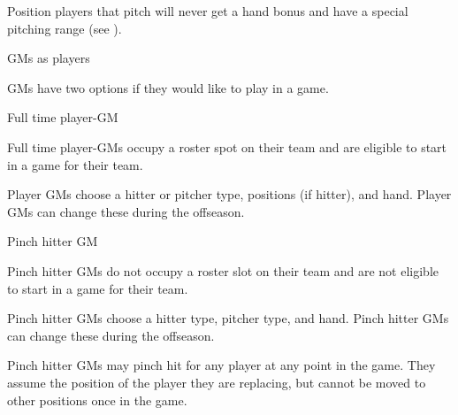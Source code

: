 \begin{deepEnumerate}
\begin{deepEnumerate}
\begin{deepEnumerate}
			\item Position players that pitch will never get a hand bonus and have a special pitching range (see ).
		\end{deepEnumerate}
		\item GMs as players
		\label{sec:GMs as Players}
		\begin{deepEnumerate}
			\item GMs have two options if they would like to play in a game.
			\begin{deepEnumerate}
				\item Full time player-GM
				\begin{deepEnumerate}
					\item Full time player-GMs occupy a roster spot on their team and are eligible to start in a game for their team.
					\item Player GMs choose a hitter or pitcher type, positions (if hitter), and hand. Player GMs can change these during the offseason.
				\end{deepEnumerate}
				\item Pinch hitter GM
				\begin{deepEnumerate}
					\item Pinch hitter GMs do not occupy a roster slot on their team and are not eligible to start in a game for their team.
					\item Pinch hitter GMs choose a hitter type, pitcher type, and hand. Pinch hitter GMs can change these during the offseason.
					\item Pinch hitter GMs may pinch hit for any player at any point in the game. They assume the position of the player they are replacing,
					but cannot be moved to other positions once in the game.
				\end{deepEnumerate}
			\end{deepEnumerate}
		\end{deepEnumerate}
	\end{deepEnumerate}
\end{deepEnumerate}

